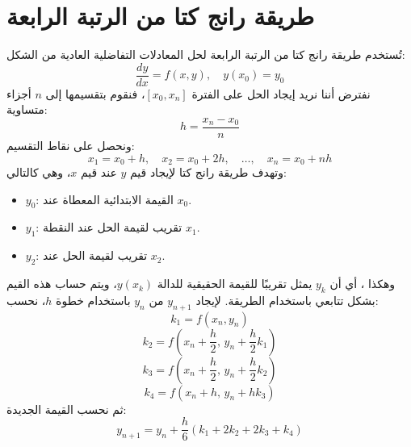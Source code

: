 \section{طريقة رانج كتا من الرتبة الرابعة }

تُستخدم طريقة رانج كتا من الرتبة الرابعة لحل المعادلات التفاضلية العادية من الشكل:
\[
\frac{dy}{dx} = f(x, y), \quad y(x_0) = y_0
\]
نفترض أننا نريد إيجاد الحل على الفترة \( [x_0, x_n] \)، فنقوم بتقسيمها إلى \( n \) أجزاء متساوية:
\[
h = \frac{x_n - x_0}{n}
\]
ونحصل على نقاط التقسيم:
\[
x_1 = x_0 + h,\quad x_2 = x_0 + 2h,\quad \dots,\quad x_n = x_0 + nh
\]
وتهدف طريقة رانج كتا لإيجاد قيم $y$ عند قيم $x$، وهي كالتالي:
\begin{itemize}
	\item \( y_0 \): القيمة الابتدائية المعطاة عند \( x_0 \).
	\item \( y_1 \): تقريب لقيمة الحل عند النقطة \( x_1 \).
	\item \( y_2 \): تقريب لقيمة الحل عند \( x_2 \).
\end{itemize}
وهكذا ، 
أي أن \( y_k \) يمثل تقريبًا للقيمة الحقيقية للدالة \( y(x_k) \)، ويتم حساب هذه القيم بشكل تتابعي باستخدام الطريقة.
لإيجاد \( y_{n+1} \) من \( y_n \) باستخدام خطوة \( h \)، نحسب:
\[
k_1 = f(x_n, y_n)
\]
\[
k_2 = f\left(x_n + \frac{h}{2}, \, y_n + \frac{h}{2} k_1 \right)
\]
\[
k_3 = f\left(x_n + \frac{h}{2}, \, y_n + \frac{h}{2} k_2 \right)
\]
\[
k_4 = f(x_n + h, \, y_n + h k_3)
\]
ثم نحسب القيمة الجديدة:
\[
y_{n+1} = y_n + \frac{h}{6} \left( k_1 + 2k_2 + 2k_3 + k_4 \right)
\]